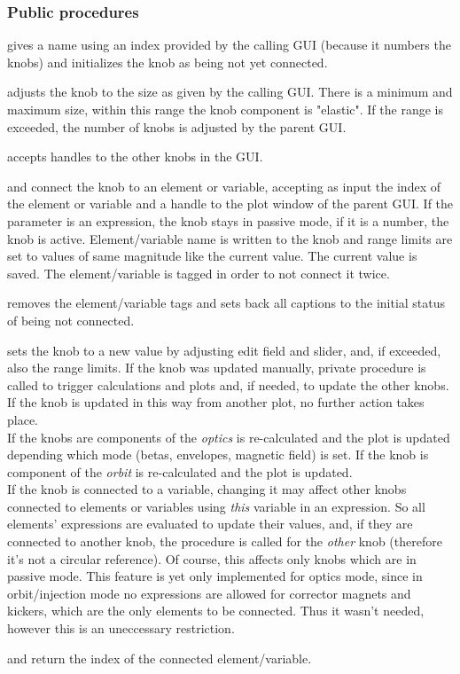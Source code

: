 \documentclass[12pt]{article}
\newcommand\code[1]{{\tt #1}}
\newcommand\guifco[1]{{\color{violet}\code{#1}}}
\newcommand{\opagui}[1]{\colorbox{blue!20}{{\color{black}\code{#1}}}}
\newcommand{\ogui}[1]{\hyperref[#1]{\opagui{#1}}}
\newcommand{\ppro}[1]{\subsubsection*{Public procedures} #1}
\newcommand{\todo}[1]{{\color{red} #1}}
\begin{document}
\ppro{
\guifco{Init} gives a name using an index provided by the calling GUI (because it numbers the knobs) and initializes the knob as being not yet connected.

\guifco{SetSize} adjusts the knob to the size as given by the calling GUI. There is a minimum and maximum size, within this range the knob component is "elastic". If the range is exceeded, the number of knobs is adjusted by the parent GUI.

\guifco{Brotherhandles} accepts handles to the other knobs in the GUI.

\guifco{Load} and \guifco{LoadVar} connect the knob to an element or variable, accepting as input the index of the element or variable and a handle to the plot window of the parent GUI. If the parameter is an expression, the knob stays in passive mode, if it is a number, the knob is active. Element/variable name is written to the knob and range limits are set to values of same magnitude like the current value. The current value is saved. The element/variable is tagged in order to not connect it twice.

\guifco{UnLoad} removes the element/variable tags and sets back all captions to the initial status of being not connected.

\guifco{KUpdate} sets the knob to a new value by adjusting edit field and slider, and, if exceeded, also the range limits. If the knob was updated manually, private procedure \guifco{Action} is called to trigger calculations and plots and, if needed, to update the other knobs. If the knob is updated in this way from another plot, no further action takes place.\\
If the knobs are components of \ogui{opalinop} the {\em optics} is re-calculated and the plot is updated depending which mode (betas, envelopes, magnetic field) is set.
If the knob is component of \ogui{opaorbit} the {\em orbit} is re-calculated and the plot is updated.\\
If the knob is connected to a variable, changing it may affect other knobs connected to elements or variables using {\em this} variable in an expression. So all elements' expressions are evaluated to update their values, and, if they are connected to another knob, the \guifco{KUpdate} procedure is called for the {\em other} knob (therefore it's not a circular reference). Of course, this affects only knobs which are in passive mode. \todo{This feature is yet only implemented for optics mode, since in orbit/injection mode no expressions are allowed for corrector magnets and kickers, which are the only elements to be connected. Thus it wasn't needed, however this is an uneccessary restriction.}

\guifco{getella} and \guifco{getvar} return the index of the connected element/variable.
}
\end{document}
